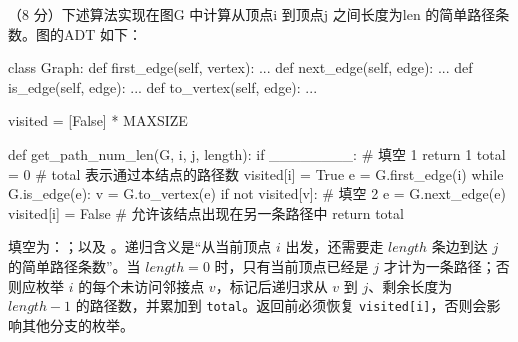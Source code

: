 \begin{question}
（8 分）下述算法实现在图G 中计算从顶点i 到顶点j 之间长度为len 的简单路径条数。图的ADT 如下：
\begin{pycode}
class Graph:
    def first_edge(self, vertex): ...
    def next_edge(self, edge): ...
    def is_edge(self, edge): ...
    def to_vertex(self, edge): ...


visited = [False] * MAXSIZE


def get_path_num_len(G, i, j, length):
    if ________:                # 填空 1
        return 1
    total = 0              # total 表示通过本结点的路径数
    visited[i] = True
    e = G.first_edge(i)
    while G.is_edge(e):
        v = G.to_vertex(e)
        if not visited[v]:
            # 填空 2
        e = G.next_edge(e)
    visited[i] = False     # 允许该结点出现在另一条路径中
    return total
\end{pycode}
\begin{solution}
填空为：\texttt{}；以及 \texttt{}。递归含义是“从当前顶点 $i$ 出发，还需要走 $length$ 条边到达 $j$ 的简单路径条数”。当 $length=0$ 时，只有当前顶点已经是 $j$ 才计为一条路径；否则应枚举 $i$ 的每个未访问邻接点 $v$，标记后递归求从 $v$ 到 $j$、剩余长度为 $length-1$ 的路径数，并累加到 \texttt{total}。返回前必须恢复 \texttt{visited[i]}，否则会影响其他分支的枚举。
\end{solution}
\end{question}

